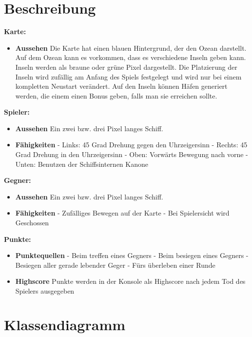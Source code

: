 \documentclass{article}
\begin{document}
\section{Beschreibung}
\textbf{Karte:}
\begin{itemize}
    \item \textbf{Aussehen}
        \newline
        Die Karte hat einen blauen Hintergrund, der den Ozean darstellt. Auf dem Ozean kann es vorkommen, dass es verschiedene Inseln geben kann. Inseln werden als braune oder grüne Pixel dargestellt. Die Platzierung der Inseln wird zufällig am Anfang des Spiels festgelegt und wird nur bei einem kompletten Neustart verändert. Auf den Inseln können Häfen generiert werden, die einem einen Bonus geben, falls man sie erreichen sollte.
\end{itemize}
\textbf{Spieler:}
\begin{itemize}
    \item \textbf{Aussehen}
        \newline
        Ein zwei bzw. drei Pixel langes Schiff.
    \item \textbf{Fähigkeiten}
        \newline - Links: 45 Grad Drehung gegen den Uhrzeigersinn
        \newline - Rechts: 45 Grad Drehung in den Uhrzeigersinn
        \newline - Oben: Vorwärts Bewegung nach vorne
        \newline - Unten: Benutzen der Schiffsinternen Kanone
\end{itemize}
\textbf{Gegner:}
\begin{itemize}
    \item \textbf{Aussehen}
        \newline
        Ein zwei bzw. drei Pixel langes Schiff.
    \item \textbf{Fähigkeiten}
        \newline - Zufälliges Bewegen auf der Karte
        \newline - Bei Spielersicht wird Geschossen
\end{itemize}
\textbf{Punkte:}
\begin{itemize}
    \item \textbf{Punktequellen}
        \newline - Beim treffen eines Gegners
        \newline - Beim besiegen eines Gegners
        \newline - Besiegen aller gerade lebender Geger
        \newline - Fürs überleben einer Runde
    \item \textbf{Highscore}
        \newline
        Punkte werden in der Konsole als Highscore nach jedem Tod des Spielers ausgegeben
\end{itemize}
\newpage

\section{Klassendiagramm}
\newpage
\end{document}
